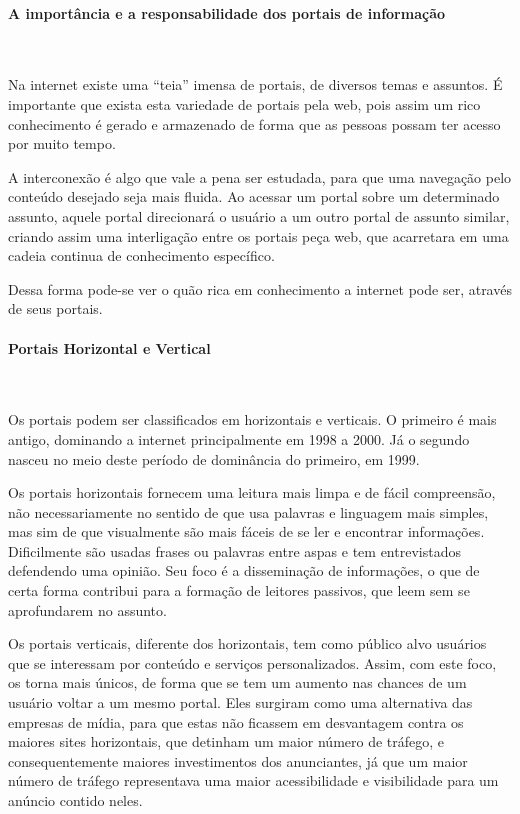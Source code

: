 \paragraph{A importância e a responsabilidade dos portais de informação}\mbox{}\\
\par
Na internet existe uma “teia” imensa de portais, de diversos temas e assuntos. É importante que exista esta variedade de portais pela web, pois assim um rico conhecimento é gerado e armazenado de forma que as pessoas possam ter acesso por muito tempo.

A interconexão é algo que vale a pena ser estudada, para que uma navegação pelo conteúdo desejado seja mais fluida. Ao acessar um portal sobre um determinado assunto, aquele portal direcionará o usuário a um outro portal de assunto similar, criando assim uma interligação entre os portais peça web, que acarretara em uma cadeia continua de conhecimento específico.

Dessa forma pode-se ver o quão rica em conhecimento a internet pode ser, através de seus portais.

\paragraph{Portais Horizontal e Vertical}\mbox{}\\
\par
Os portais podem ser classificados em horizontais e verticais. O primeiro é mais antigo, dominando a internet principalmente em 1998 a 2000. Já o segundo nasceu no meio deste período de dominância do primeiro, em 1999.

Os portais horizontais fornecem uma leitura mais limpa e de fácil compreensão, não necessariamente no sentido de que usa palavras e linguagem mais simples, mas sim de que visualmente são mais fáceis de se ler e encontrar informações. Dificilmente são usadas frases ou palavras entre aspas e tem entrevistados defendendo uma opinião. Seu foco é a disseminação de informações, o que de certa forma contribui para a formação de leitores passivos, que leem sem se aprofundarem no assunto.

Os portais verticais, diferente dos horizontais, tem como público alvo usuários que se interessam por conteúdo e serviços personalizados. Assim, com este foco, os torna mais únicos, de forma que se tem um aumento nas chances de um usuário voltar a um mesmo portal. Eles surgiram como uma alternativa das empresas de mídia, para que estas não ficassem em desvantagem contra os maiores sites horizontais, que detinham um maior número de tráfego, e consequentemente maiores investimentos dos anunciantes, já que um maior número de tráfego representava uma maior acessibilidade e visibilidade para um anúncio contido neles.
\newpage
